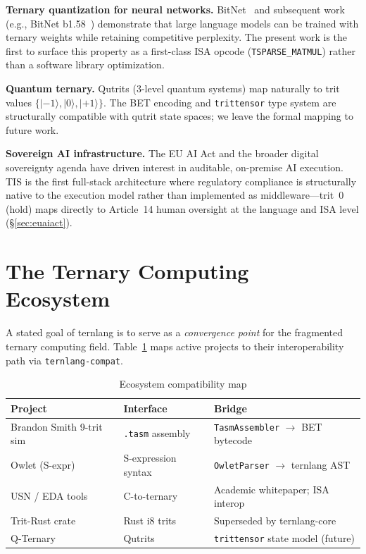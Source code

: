 \documentclass[11pt,a4paper]{article}
\begin{document}
\textbf{Ternary quantization for neural networks.} BitNet~\cite{ma2024era}
and subsequent work (e.g., BitNet b1.58~\cite{ma2024bitnet158}) demonstrate
that large language models can be trained with ternary weights while retaining
competitive perplexity. The present work is the first to surface this property
as a first-class ISA opcode (\texttt{TSPARSE\_MATMUL}) rather than a software
library optimization.

\textbf{Quantum ternary.} Qutrits (3-level quantum systems) map naturally to
trit values $\{|{-1}\rangle, |0\rangle, |{+1}\rangle\}$. The BET encoding and
\texttt{trittensor} type system are structurally compatible with qutrit state
spaces; we leave the formal mapping to future work.

\textbf{Sovereign AI infrastructure.} The EU AI Act and the broader digital
sovereignty agenda have driven interest in auditable, on-premise AI execution.
TIS is the first full-stack architecture where regulatory compliance is
structurally native to the execution model rather than implemented as
middleware---trit~$0$ (hold) maps directly to Article~14 human oversight at
the language and ISA level (\S\ref{sec:euaiact}).

\section{The Ternary Computing Ecosystem}
\label{sec:ecosystem}

A stated goal of ternlang is to serve as a \emph{convergence point} for the
fragmented ternary computing field. Table~\ref{tab:ecosystem} maps active
projects to their interoperability path via \texttt{ternlang-compat}.

\begin{table}[htbp]
\centering
\small
\caption{Ecosystem compatibility map}
\label{tab:ecosystem}
\begin{tabular}{p{2.2cm}p{2.2cm}p{2.8cm}}
\toprule
Project & Interface & Bridge \\
\midrule
Brandon Smith 9-trit sim & \texttt{.tasm} assembly & \texttt{TasmAssembler} $\to$ BET bytecode \\
Owlet (S-expr) & S-expression syntax & \texttt{OwletParser} $\to$ ternlang AST \\
USN / EDA tools & C-to-ternary & Academic whitepaper; ISA interop \\
Trit-Rust crate & Rust i8 trits & Superseded by ternlang-core \\
Q-Ternary & Qutrits & \texttt{trittensor} state model (future) \\
\bottomrule
\end{tabular}
\end{table}
\end{document}
